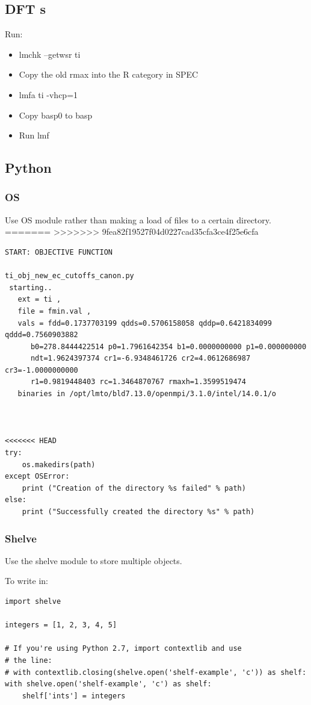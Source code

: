\documentclass[11pt]{article}
\begin{document}
\subsection{DFT s}
\label{sec:orgc1ac739}
Run:
\begin{itemize}
\item lmchk --getwsr ti
\item Copy the old rmax into the R category in SPEC
\item lmfa ti -vhcp=1
\item Copy basp0 to basp
\item Run lmf
\end{itemize}
\subsection{Python}
\label{sec:org229fa1d}
\subsubsection{OS}
\label{sec:org6272254}
Use OS module rather than making a load of files to a certain directory. 
=======
>>>>>>> 9fea82f19527f04d0227cad35cfa3ce4f25e6cfa
\begin{verbatim}
START: OBJECTIVE FUNCTION

ti_obj_new_ec_cutoffs_canon.py 
 starting..
   ext = ti ,
   file = fmin.val ,
   vals = fdd=0.1737703199 qdds=0.5706158058 qddp=0.6421834099 qddd=0.7560903882 
	  b0=278.8444422514 p0=1.7961642354 b1=0.0000000000 p1=0.000000000
	  ndt=1.9624397374 cr1=-6.9348461726 cr2=4.0612686987 cr3=-1.0000000000
	  r1=0.9819448403 rc=1.3464870767 rmaxh=1.3599519474  
   binaries in /opt/lmto/bld7.13.0/openmpi/3.1.0/intel/14.0.1/o



<<<<<<< HEAD
try:  
    os.makedirs(path)
except OSError:  
    print ("Creation of the directory %s failed" % path)
else:  
    print ("Successfully created the directory %s" % path)
\end{verbatim}
\subsubsection{Shelve}
\label{sec:orgfda5a05}
Use the shelve module to store multiple objects. 

To write in:
\begin{verbatim}
import shelve

integers = [1, 2, 3, 4, 5]

# If you're using Python 2.7, import contextlib and use
# the line:
# with contextlib.closing(shelve.open('shelf-example', 'c')) as shelf:
with shelve.open('shelf-example', 'c') as shelf:
    shelf['ints'] = integers
\end{verbatim}
\end{document}
